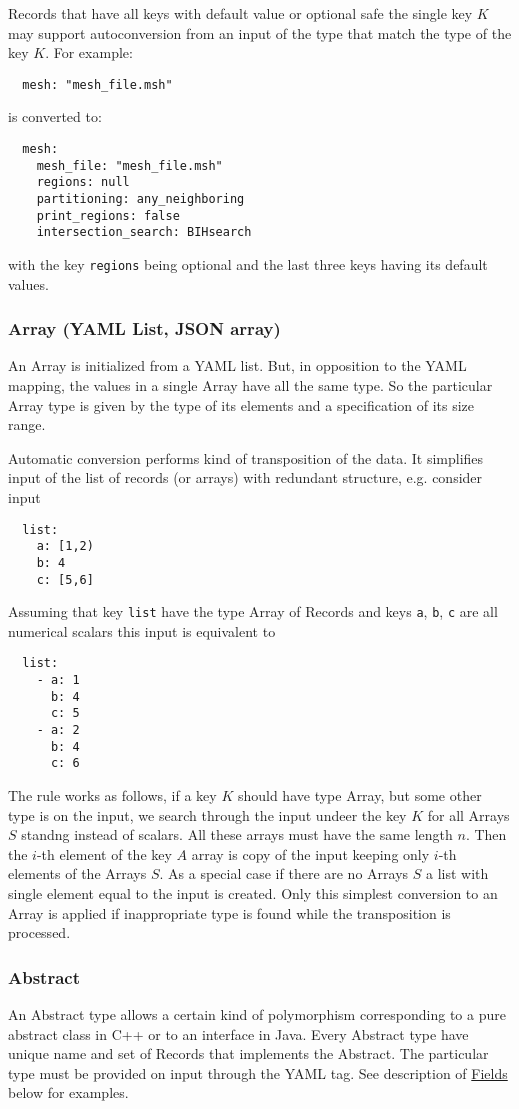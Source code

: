Records that have all keys with default value or optional safe the single key $K$ may support autoconversion from an input of the type that match 
the type of the key $K$. For example:
\begin{verbatim}
  mesh: "mesh_file.msh"
\end{verbatim}
is converted to:
\begin{verbatim}
  mesh:
    mesh_file: "mesh_file.msh"
    regions: null
    partitioning: any_neighboring
    print_regions: false
    intersection_search: BIHsearch
\end{verbatim}
with the key \verb'regions' being optional and the last three keys having its default values. 


\subsubsection{Array (YAML List, JSON array)}
An Array is initialized from a YAML list. But, in opposition to the YAML mapping, the values in a single Array 
have all the same type. So the particular Array type is given by the type of its elements and a specification of its size range.

Automatic conversion performs kind of transposition of the data. It simplifies input of the list of records (or arrays) 
with redundant structure, e.g. consider input
\begin{verbatim}
  list:
    a: [1,2)
    b: 4
    c: [5,6]
\end{verbatim}
Assuming that key \verb'list' have the type Array of Records and keys \verb'a', \verb'b', \verb'c' are all numerical scalars this input is equivalent to
\begin{verbatim}
  list:
    - a: 1
      b: 4
      c: 5
    - a: 2
      b: 4
      c: 6
\end{verbatim}
The rule works as follows, if a key $K$ should have type Array, but some other type is on the input, 
we search through the input undeer the key $K$ for all Arrays $S$ standng instead of scalars.
All these arrays must have the same length $n$. Then the $i$-th element of the key $A$ array is
copy of the input keeping only $i$-th elements of the Arrays $S$.
As a special case if there are no Arrays $S$ a list with single element equal to the input is created.
Only this simplest conversion to an Array is applied if inappropriate type is found 
while the transposition is processed.





\subsubsection{Abstract}
\label{sec:abstract}
An Abstract type allows a certain kind of polymorphism corresponding to a pure abstract class in C++ or to an interface in Java. 
Every Abstract type have unique name and set of Records that implements the Abstract. The particular type must be provided on input through the YAML tag.
See description of \hyperlink{sec:Fields}{Fields} below for examples.

